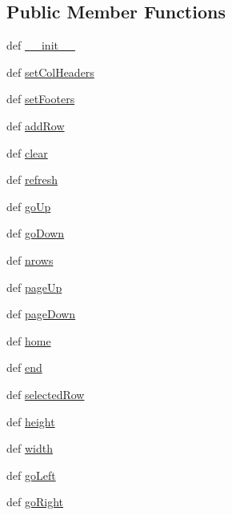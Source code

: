 \subsection*{Public Member Functions}
\begin{DoxyCompactItemize}
\item 
def \hyperlink{classcurseshelpers_1_1SelectTable_a4e045ace3648d4e87330315ef650bc3e}{\-\_\-\-\_\-init\-\_\-\-\_\-}
\item 
def \hyperlink{classcurseshelpers_1_1SelectTable_ae63b18b67d9eb2b6f806eb9990e0b793}{set\-Col\-Headers}
\item 
def \hyperlink{classcurseshelpers_1_1SelectTable_a3b06214bc213e7bd04de8172f88d7020}{set\-Footers}
\item 
def \hyperlink{classcurseshelpers_1_1SelectTable_a7f4ece14e82aa7b93d32df5d68b180d9}{add\-Row}
\item 
def \hyperlink{classcurseshelpers_1_1SelectTable_acc56cdcc64e54214c793c988814d20c5}{clear}
\item 
def \hyperlink{classcurseshelpers_1_1SelectTable_a207de3d11dc8c8d071104b9a63b276c9}{refresh}
\item 
def \hyperlink{classcurseshelpers_1_1SelectTable_ab3fef8eae92bdb1199dfb99f3ef21928}{go\-Up}
\item 
def \hyperlink{classcurseshelpers_1_1SelectTable_a0e5c56f252064f2cfa934e410109adf7}{go\-Down}
\item 
def \hyperlink{classcurseshelpers_1_1SelectTable_addb7916f5d4ae9058b62cf613a9a2710}{nrows}
\item 
def \hyperlink{classcurseshelpers_1_1SelectTable_ace9daee9d24c74f2e163032520f5dade}{page\-Up}
\item 
def \hyperlink{classcurseshelpers_1_1SelectTable_a8c32338192025724be6aa8526fba3724}{page\-Down}
\item 
def \hyperlink{classcurseshelpers_1_1SelectTable_a0f6f21b434cc0958aa43704252cf5fb1}{home}
\item 
def \hyperlink{classcurseshelpers_1_1SelectTable_a2b99d5ab593d0ea59f64b90f54b6e8dc}{end}
\item 
def \hyperlink{classcurseshelpers_1_1SelectTable_aa3d3adc70a425453a089aaf6b0e2bb58}{selected\-Row}
\item 
def \hyperlink{classcurseshelpers_1_1SelectTable_afa198f9577851ecc323a2992a5c719a8}{height}
\item 
def \hyperlink{classcurseshelpers_1_1SelectTable_a226db0ab59a447deef8527b6bc2cdcbd}{width}
\item 
def \hyperlink{classcurseshelpers_1_1BaseElement_a8dad4b03794798c7b6de02554312859f}{go\-Left}
\item 
def \hyperlink{classcurseshelpers_1_1BaseElement_aac34d4e8081c795ff91dd124a997cf2a}{go\-Right}
\end{DoxyCompactItemize}
